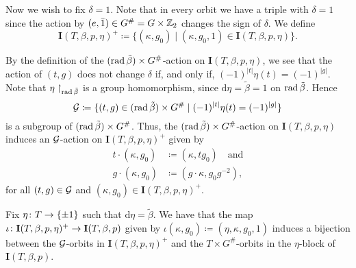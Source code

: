 Now we wish to fix $\delta = 1$.
Note that in every orbit we have a triple with $\delta = 1$ since the action by $(e, \bar1) \in G^\# = G \times \mathbb{Z}_2$ changes the sign of $\delta$.
We define
\[
	\mathbf{I}(T, \beta, p, \eta)^+ \coloneqq \{ (\kappa, g_0) \mid (\kappa, g_0, 1) \in \mathbf{I}(T, \beta, p, \eta)\}.
\]

By the definition of the $(\operatorname{rad} \tilde\beta) \times G^\#$-action on $\mathbf{I}(T, \beta, p, \eta)$, we see that the action of $(t,g)$ does not change $\delta$ if, and only if, $
	(-1)^{|t|}\eta(t) = (-1)^{|g|}.
$
Note that $\eta\restriction_{\operatorname{rad} \tilde\beta}$ is a group homomorphism, since $\mathrm{d}\eta = \tilde\beta = 1$ on $\operatorname{rad} \tilde\beta$.
Hence \[
	\mathcal G \coloneqq \{ (t,g) \in (\operatorname{rad} \tilde\beta) \times G^\# \mid (-1)^{|t|}\eta(t) = (-1)^{|g|} \}
\]
is a subgroup of $(\operatorname{rad} \tilde\beta) \times G^\#$.
Thus, the $(\operatorname{rad} \tilde\beta) \times G^\#$-action on $\mathbf{I}(T, \beta, p, \eta)$ induces an $\mathcal G$-action on $\mathbf{I}(T, \beta, p, \eta)^+$ given by
\begin{align}
	t \cdot (\kappa, g_0) & \coloneqq (\kappa, t g_0)
	\quad \text{and}                                               \\
	g \cdot (\kappa, g_0) & \coloneqq (g\cdot \kappa, g_0 g^{-2}),
\end{align}
for all $(t, g)\in \mathcal G$ and $(\kappa, g_0) \in \mathbf{I}(T, \beta, p, \eta)^+$.

\begin{prop}
	Fix $\eta\colon T \to \{ \pm 1 \}$ such that $\mathrm{d}\eta = \tilde\beta$.
	We have that the map $\iota\colon \mathbf{I}(T,\beta,p,\eta)^+ \to \mathbf{I}(T,\beta,p)$ given by $\iota(\kappa, g_0) \coloneqq (\eta,\kappa, g_0, 1)$ induces a bijection between the $\mathcal G$-orbits in $\mathbf{I}(T,\beta,p,\eta)^+$ and the $T\times G^\#$-orbits in the $\eta$-block of $\mathbf{I}(T,\beta,p)$.
\end{prop}

